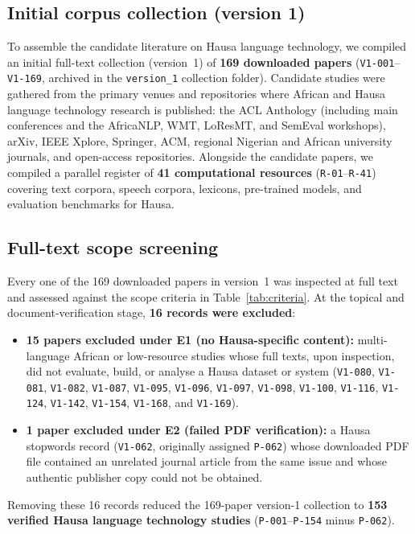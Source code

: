 \documentclass[sn-basic,pdflatex]{sn-jnl}
\begin{document}
\subsection{Initial corpus collection (version 1)}\label{sec:provenance}
To assemble the candidate literature on Hausa language technology, we compiled an initial full-text collection (version~1) of \textbf{169 downloaded papers} (\texttt{V1-001}--\texttt{V1-169}, archived in the \texttt{version\_1} collection folder). Candidate studies were gathered from the primary venues and repositories where African and Hausa language technology research is published: the ACL Anthology (including main conferences and the AfricaNLP, WMT, LoResMT, and SemEval workshops), arXiv, IEEE Xplore, Springer, ACM, regional Nigerian and African university journals, and open-access repositories. Alongside the candidate papers, we compiled a parallel register of \textbf{41 computational resources} (\texttt{R-01}--\texttt{R-41}) covering text corpora, speech corpora, lexicons, pre-trained models, and evaluation benchmarks for Hausa.

\subsection{Full-text scope screening}\label{sec:screening}
Every one of the 169 downloaded papers in version~1 was inspected at full text and assessed against the scope criteria in Table~\ref{tab:criteria}. At the topical and document-verification stage, \textbf{16 records were excluded}:
\begin{itemize}\itemsep2pt
  \item \textbf{15 papers excluded under E1 (no Hausa-specific content):} multi-language African or low-resource studies whose full texts, upon inspection, did not evaluate, build, or analyse a Hausa dataset or system (\texttt{V1-080}, \texttt{V1-081}, \texttt{V1-082}, \texttt{V1-087}, \texttt{V1-095}, \texttt{V1-096}, \texttt{V1-097}, \texttt{V1-098}, \texttt{V1-100}, \texttt{V1-116}, \texttt{V1-124}, \texttt{V1-142}, \texttt{V1-154}, \texttt{V1-168}, and \texttt{V1-169}).
  \item \textbf{1 paper excluded under E2 (failed PDF verification):} a Hausa stopwords record (\texttt{V1-062}, originally assigned \texttt{P-062}) whose downloaded PDF file contained an unrelated journal article from the same issue and whose authentic publisher copy could not be obtained.
\end{itemize}
Removing these 16 records reduced the 169-paper version-1 collection to \textbf{153 verified Hausa language technology studies} (\texttt{P-001}--\texttt{P-154} minus \texttt{P-062}).
\end{document}
